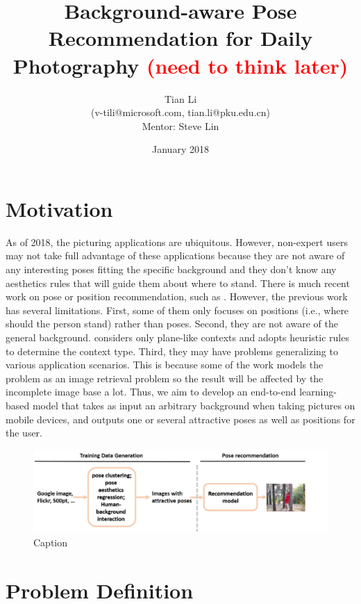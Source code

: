 \documentclass{article}
\title{Background-aware Pose Recommendation for Daily Photography \textcolor{red}{(need to think later)}}
\author{Tian Li \\ (v-tili@microsoft.com, tian.li@pku.edu.cn) \\ Mentor: Steve Lin}
\date{January 2018}
\begin{document}
\maketitle

\section{Motivation}


As of 2018, the picturing applications are ubiquitous. However, non-expert users may not take full advantage of these applications because they are not aware of any interesting poses fitting the specific background and they don't know any aesthetics rules that will guide them about where to stand. There is much recent work on pose or position recommendation, such as \cite{wang2015where2stand, xu2014should, ma2014pose, zhu2014mirror, fu2013data}. However, the previous work has several limitations. First, some of them only focuses on positions (i.e., where should the person stand) rather than poses. Second, they are not aware of the general background. \cite{fu2013data} considers only plane-like contexts and adopts heuristic rules to determine the context type. Third, they may have problems generalizing to various application scenarios. This is because some of the work models the problem as an image retrieval problem so the result will be affected by the incomplete image base a lot. Thus, 
we aim to develop an end-to-end learning-based model that takes as input an arbitrary background when taking pictures on mobile devices, and outputs one or several attractive poses as well as positions for the user.

\begin{figure}
    \centering
    \includegraphics[scale=0.5]{figure/general}
    \caption{Caption}
    \label{fig:my_label}
\end{figure}

\section{Problem Definition}
\end{document}
